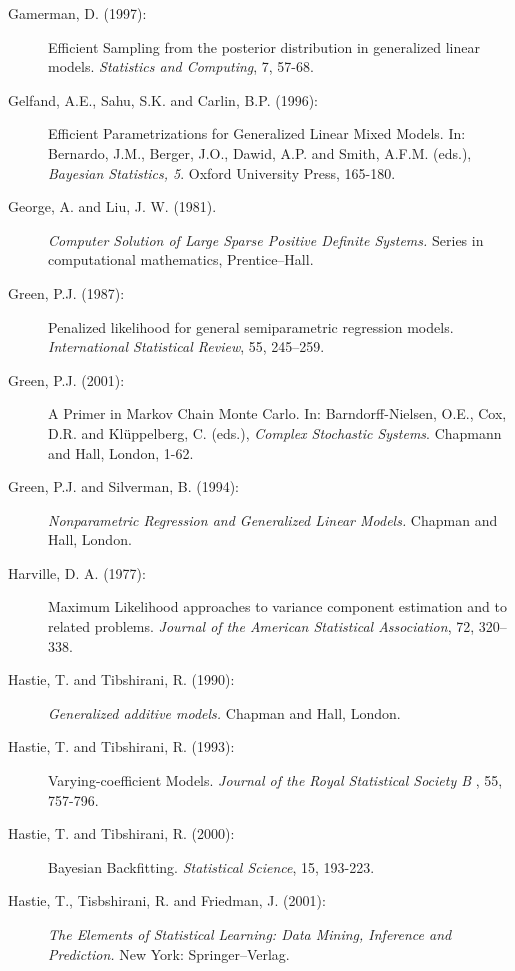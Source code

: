 \documentclass[11pt,a4paper,twoside]{bayesxarticle}
\begin{document}
\begin{description}
\item[Gamerman, D. (1997):] Efficient Sampling from the posterior distribution
in generalized linear models. {\em Statistics and Computing}, 7,
57-68.

\item[Gelfand, A.E., Sahu, S.K. and Carlin, B.P. (1996):] Efficient Parametrizations for
Generalized Linear Mixed Models. In: Bernardo, J.M., Berger, J.O.,
Dawid, A.P. and Smith, A.F.M. (eds.), {\em Bayesian Statistics,
5}. Oxford University Press, 165-180.

\item[George, A. and Liu, J. W. (1981).] {\em Computer Solution of Large
Sparse Positive Definite Systems.} Series in computational
mathematics, Prentice--Hall.

\item[Green, P.J. (1987):] Penalized
likelihood for general semiparametric regression models. {\it
International Statistical Review}, 55, 245--259.

\item[Green, P.J. (2001):] A Primer in Markov Chain Monte Carlo. In: Barndorff-Nielsen, O.E.,
Cox, D.R. and Kl\"{u}ppelberg, C. (eds.), {\em Complex Stochastic
Systems}. Chapmann and Hall, London, 1-62.

\item[Green, P.J. and Silverman, B. (1994):] {\em Nonparametric Regression and Generalized Linear Models.} Chapman
and Hall, London.

\item[Harville, D. A. (1977):]
Maximum Likelihood approaches to variance component estimation and
to related problems. {\it Journal of the American Statistical
Association}, 72, 320--338.

\item[Hastie, T. and Tibshirani, R. (1990):] {\em Generalized additive models.} Chapman and
Hall, London.

\item[Hastie, T. and Tibshirani, R. (1993):] Varying-coefficient Models.
{\em Journal of the Royal Statistical Society B} , 55, 757-796.

\item[Hastie, T. and Tibshirani, R. (2000):] Bayesian Backfitting. {\em Statistical Science}, 15, 193-223.

\item[Hastie, T., Tisbshirani, R. and Friedman, J. (2001):] {\em The Elements of Statistical Learning: Data Mining,
Inference and Prediction.} New York: Springer--Verlag.


\end{description}
\end{document}
